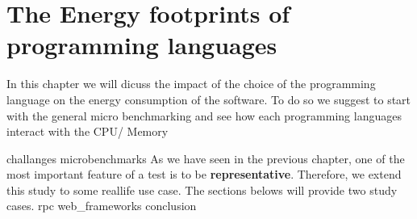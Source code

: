 \newpage

\chapter{The Energy footprints of programming languages}
\label{chapter:porgramming_langauges}
In this chapter we will dicuss the impact of the choice of the programming language on the energy consumption of the software.
To do so we suggest to start with the general micro benchmarking and see how each programming languages interact with the CPU/ Memory



{challanges}
{microbenchmarks}
As we have seen in the previous chapter, one of the most important feature of a test is to be \textbf{representative}. Therefore, we extend this study to some reallife use case. The sections belows will provide two study cases.
{rpc}
{web_frameworks}
{conclusion}
